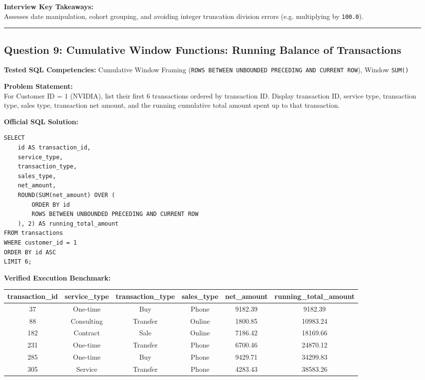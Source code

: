 \documentclass[11pt,a4paper]{article}
\begin{document}
\vspace{0.15cm}
\noindent\textbf{Interview Key Takeaways:} \\
Assesses date manipulation, cohort grouping, and avoiding integer truncation division errors (e.g. multiplying by \texttt{100.0}).

\vspace{0.4cm}
\noindent\rule{\textwidth}{0.4pt}
\vspace{0.4cm}

\subsection*{Question 9: Cumulative Window Functions: Running Balance of Transactions}

\noindent\textbf{Tested SQL Competencies:} Cumulative Window Framing (\texttt{ROWS BETWEEN UNBOUNDED PRECEDING AND CURRENT ROW}), Window \texttt{SUM()}

\vspace{0.15cm}
\noindent\textbf{Problem Statement:} \\
For Customer ID = 1 (NVIDIA), list their first 6 transactions ordered by transaction ID. Display transaction ID, service type, transaction type, sales type, transaction net amount, and the running cumulative total amount spent up to that transaction.

\vspace{0.25cm}
\noindent\textbf{Official SQL Solution:}
\begin{verbatim}
SELECT 
    id AS transaction_id,
    service_type,
    transaction_type,
    sales_type,
    net_amount,
    ROUND(SUM(net_amount) OVER (
        ORDER BY id 
        ROWS BETWEEN UNBOUNDED PRECEDING AND CURRENT ROW
    ), 2) AS running_total_amount
FROM transactions
WHERE customer_id = 1
ORDER BY id ASC
LIMIT 6;
\end{verbatim}

\vspace{0.15cm}
\noindent\textbf{Verified Execution Benchmark:}
\begin{center}
\small
\begin{tabular}{cccccc}
\toprule
\textbf{transaction\_id} & \textbf{service\_type} & \textbf{transaction\_type} & \textbf{sales\_type} & \textbf{net\_amount} & \textbf{running\_total\_amount} \\
\midrule
37 & One-time & Buy & Phone & 9182.39 & 9182.39 \\
88 & Consulting & Transfer & Online & 1800.85 & 10983.24 \\
182 & Contract & Sale & Online & 7186.42 & 18169.66 \\
231 & One-time & Transfer & Phone & 6700.46 & 24870.12 \\
285 & One-time & Buy & Phone & 9429.71 & 34299.83 \\
305 & Service & Transfer & Phone & 4283.43 & 38583.26 \\
\bottomrule
\end{tabular}
\end{center}
\end{document}
